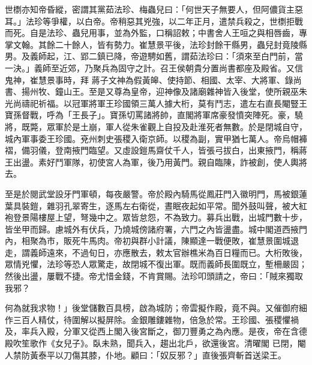 \begin{pinyinscope}
 世檦亦知帝昏縱，密謂其黨茹法珍、梅蟲兒曰：「何世天子無要人，但阿儂貨主惡耳。」法珍等爭權，以白帝。帝稍惡其兇強，以二年正月，遣禁兵殺之，世檦拒戰而死。自是法珍、蟲兒用事，並為外監，口稱詔敕；中書舍人王咺之與相唇齒，專掌文翰。其餘二十餘人，皆有勢力。崔慧景平後，法珍封餘干縣男，蟲兒封竟陵縣男。及義師起，江、郢二鎮已降，帝遊騁如舊，謂茹法珍曰：「須來至白門前，當一決。」義師至近郊，乃聚兵為固守之計。召王侯朝貴分置尚書都座及殿省。又信鬼神，崔慧景事時，拜
 蔣子文神為假黃皞、使持節、相國、太宰、大將軍、錄尚書、揚州牧、鐘山王。至是又尊為皇帝，迎神像及諸廟雜神皆入後堂，使所親巫朱光尚禱祀祈福。以冠軍將軍王珍國領三萬人據大桁，莫有鬥志，遣左右直長閹豎王寶孫督戰，呼為「王長子」。寶孫切罵諸將帥，直閣將軍席豪發憤突陣死。豪，驍將，既斃，眾軍於是土崩，軍人從朱雀觀上自投及赴淮死者無數。於是閉城自守，城內軍事委王珍國。兗州刺史張稷入衛京師。以稷為副，實甲猶七萬人。帝烏帽褲褶，備羽儀，登南掖門臨望。又虛設鎧馬齋仗千人，皆張弓拔白，出東掖門，稱蔣王出盪。素好鬥軍隊，初使宮人為軍，後乃用黃門。親自臨陳，詐被創，使人輿將去。



 至是於閱武堂設牙門軍頓，每夜嚴警。帝於殿內騎馬從鳳莊門入徽明門，馬被銀蓮葉具裝鎧，雜羽孔翠寄生，逐馬左右衛從，晝眠夜起如平常。聞外鼓叫聲，被大紅
 袍登景陽樓屋上望，弩幾中之。眾皆怠怨，不為致力。募兵出戰，出城門數十步，皆坐甲而歸。慮城外有伏兵，乃燒城傍諸府署，六門之內皆盪盡。城中閣道西掖門內，相聚為市，販死牛馬肉。帝初與群小計議，陳顯達一戰便敗，崔慧景圍城退走，謂義師遠來，不過旬日，亦應散去，敕太官辦樵米為百日糧而已。大桁敗後，眾情兇懼，法珍等恐人眾驚走，故閉城不復出軍。既而義師長圍既立，塹柵嚴固；然後出盪，屢戰不捷。帝尤惜金錢，不肯賞賜。法珍叩頭請之，帝曰：「賊來獨取我邪？



 何為就我求物！」後堂儲數百具榜，啟為城防；帝雲擬作殿，竟不與。又催御府細作三百人精仗，待圍解以擬屏除。金銀雕鏤雜物，倍急於常。王珍國、張稷懼禍及，率兵入殿，分軍又從西上閣入後宮斷之，御刀豐勇之為內應。是夜，帝在含德殿吹笙歌作《女兒子》。臥未熟，聞兵入，趨出北戶，欲還後宮。清曜閣
 已閉，閹人禁防黃泰平以刀傷其膝，仆地。顧曰：「奴反邪？」直後張齊斬首送梁王。




\end{pinyinscope}
